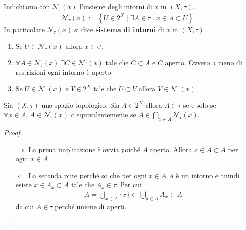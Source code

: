 \begin{definition}
	Indichiamo con $\mathcal{N}_\tau(x)$ l'insieme degli intorni di $x$ in $(X,\tau)$. 
	\begin{equation}
	\begin{aligned}
		\mathcal{N}_\tau(x) := \left\{ U \in 2^X \; | \; \exists A \in \tau \; . \; x \in A \subset U \right\}
	\end{aligned}
	\end{equation}
	In particolare $\mathcal{N}_\tau(x)$ si dice \textbf{sistema di intorni} di $x$ in $(X, \tau)$.
\end{definition}

\begin{remark}
	\label{Oss:intorni_top}
	\begin{enumerate}
		\item Se $U \in \mathcal{N}_\tau(x)$ allora $x \in U$.
		\item $\forall A \in \mathcal{N}_\tau(x) \; \exists C \in \mathcal{N}_\tau(x)$ tale che $C \subset A$ e $C$ aperto. Ovvero a meno di restrizioni ogni intorno è aperto.
		\item Se $U \in \mathcal{N}_\tau(x)$ e $V \in 2^X$ tale che $U \subset V$ allora $V \in \mathcal{N}_\tau(x)$ 
	\end{enumerate}	
\end{remark}

\begin{proposition}
	Sia $(X,\tau)$ uno spazio topologico. Sia $A \in 2^X$ allora $A \in \tau$ se e solo se $\forall x \in A . \; A \in \mathcal{N}_\tau(x)$ o equivalentemente se $A \in \bigcap_{x \in A} \mathcal{N}_\tau(x)$.
\end{proposition}
\begin{proof}
	\begin{enumerate}
		\item[$\Rightarrow$] La prima implicazione è ovvia poiché $A$ aperto. Allora $x \in A \subset A$ per ogni $x \in A$.
		\item[$\Leftarrow$]	La seconda pure perché so che per ogni $x \in A$ $A$ è un intorno e quindi esiste $x \in A_x \subset A$ tale che $A_x \in \tau$. Per cui  
		\begin{equation}
		\begin{aligned}
			A = \bigcup_{x \in A} \{x\} \subset \bigcup_{x\in A} A_x \subset A
		\end{aligned}
		\end{equation}
		da cui $A \in \tau$ perché unione di aperti. 
	\end{enumerate}
\end{proof}

